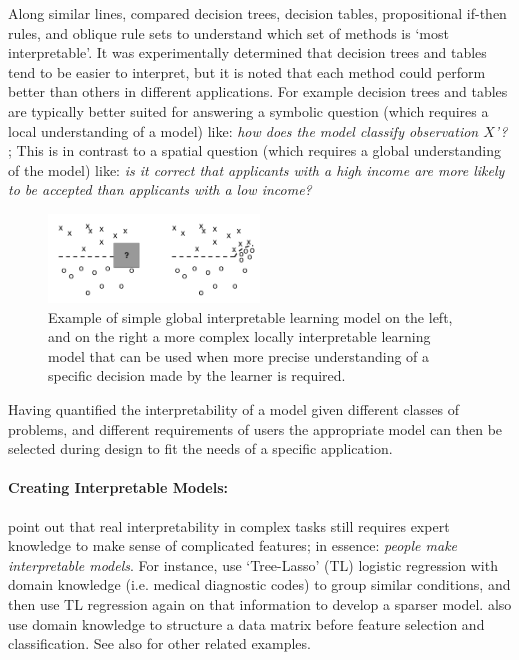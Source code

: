 Along similar lines, \citet{Huysmans2011-th} compared decision trees, decision tables, propositional if-then rules, and oblique rule sets to understand which set of methods is `most interpretable'. It was experimentally determined that decision trees and tables tend to be easier to interpret, but it is noted that each method could perform better than others in different applications. For example decision trees and tables are typically better suited for answering a symbolic question (which requires a local understanding of a model) like: \emph{how does the model classify observation $X$'?} ; This is in contrast to a spatial question (which requires a global understanding of the model) like: \emph{is it correct that applicants with a high income are more likely to be accepted than applicants with a low income?}
\begin{figure}[htbp]
    \centering
    \includegraphics[width=0.5\textwidth]{Figures/global_local}
    \caption{Example of simple global interpretable learning model on the left, and on the right a more complex locally interpretable learning model that can be used when more precise understanding of a specific decision made by the learner is required. }
    \label{fig:ruping}
\end{figure}

Having quantified the interpretability of a model given different classes of problems, and different requirements of users the appropriate model can then be selected during design to fit the needs of a specific application.

\paragraph{Creating Interpretable Models:}
\citet{Park2016-ld} point out that real interpretability in complex tasks still requires expert knowledge to make sense of complicated features; in essence: \emph{people make interpretable models}. For instance, \citet{Jovanovic2016-gw} use `Tree-Lasso' (TL) logistic regression with domain knowledge (i.e. medical diagnostic codes) to group similar conditions, and then use TL regression again on that information to develop a sparser model. \citet{Zycinski2012-jj} also use domain knowledge to structure a data matrix before feature selection and classification. See also \citet{Zhang2018-no,Khoa2018-gh} for other related examples.

